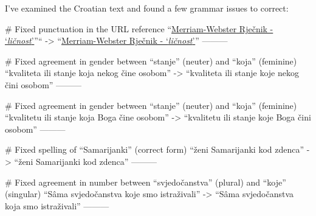 I've examined the Croatian text and found a few grammar issues to correct:

# Fixed punctuation in the URL reference
“\href{https://www.merriam-webster.com/dictionary/personality}{Merriam-Webster Rječnik - ‘\textit{ličnost}’}”“
->
“\href{https://www.merriam-webster.com/dictionary/personality}{Merriam-Webster Rječnik - ‘\textit{ličnost}’}”
---------

# Fixed agreement in gender between “stanje” (neuter) and “koja” (feminine)
“kvaliteta ili stanje koja nekog čine osobom”
->
“kvaliteta ili stanje koje nekog čini osobom”
---------

# Fixed agreement in gender between “stanje” (neuter) and “koja” (feminine)
“kvalitetu ili stanje koja Boga čine osobom”
->
“kvalitetu ili stanje koje Boga čini osobom”
---------

# Fixed spelling of “Samarijanki” (correct form)
“ženi Samarijanki kod zdenca”
->
“ženi Samarijanki kod zdenca”
---------

# Fixed agreement in number between “svjedočanstva” (plural) and “koje” (singular)
“Sâma svjedočanstva koje smo istraživali”
->
“Sâma svjedočanstva koja smo istraživali”
---------
